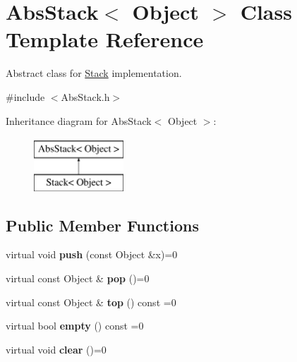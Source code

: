 \hypertarget{classAbsStack}{}\section{Abs\+Stack$<$ Object $>$ Class Template Reference}
\label{classAbsStack}


Abstract class for \hyperlink{classStack}{Stack} implementation.  




{\ttfamily \#include $<$Abs\+Stack.\+h$>$}

Inheritance diagram for Abs\+Stack$<$ Object $>$\+:\begin{figure}[H]
\begin{center}
\leavevmode
\includegraphics[height=2.000000cm]{classAbsStack}
\end{center}
\end{figure}
\subsection*{Public Member Functions}
\begin{DoxyCompactItemize}
\item 
virtual void {\bfseries push} (const Object \&x)=0\hypertarget{classAbsStack_ace9c9f220a85a96e3202af54356a8e26}{}\label{classAbsStack_ace9c9f220a85a96e3202af54356a8e26}

\item 
virtual const Object \& {\bfseries pop} ()=0\hypertarget{classAbsStack_ab80d724cba47bb4d8a399ceb123404dd}{}\label{classAbsStack_ab80d724cba47bb4d8a399ceb123404dd}

\item 
virtual const Object \& {\bfseries top} () const  =0\hypertarget{classAbsStack_aec836c9b4b5a9c58ab86ead63455e01a}{}\label{classAbsStack_aec836c9b4b5a9c58ab86ead63455e01a}

\item 
virtual bool {\bfseries empty} () const  =0\hypertarget{classAbsStack_afa498b68fa8516acf9c25d833583bf82}{}\label{classAbsStack_afa498b68fa8516acf9c25d833583bf82}

\item 
virtual void {\bfseries clear} ()=0\hypertarget{classAbsStack_a141d50ead5311933b7ab711b4d3d4cb0}{}\label{classAbsStack_a141d50ead5311933b7ab711b4d3d4cb0}

\end{DoxyCompactItemize}

